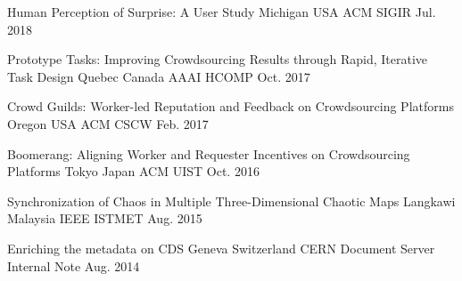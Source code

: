 

\begin{cventries}

  \cvpublications
    {Human Perception of Surprise: A User Study} %
    {Michigan USA}
    {ACM SIGIR} %
    {Jul. 2018} %


  \cvpublications
    {Prototype Tasks: Improving Crowdsourcing Results through Rapid, Iterative Task Design} %
    {Quebec Canada}
    {AAAI HCOMP} %
    {Oct. 2017} %


  \cvpublications
    {Crowd Guilds: Worker-led Reputation and Feedback on Crowdsourcing Platforms} %
    {Oregon USA}
    {ACM CSCW} %
    {Feb. 2017} %


  \cvpublications
    {Boomerang: Aligning Worker and Requester Incentives on Crowdsourcing Platforms} %
    {Tokyo Japan}
    {ACM UIST} %
    {Oct. 2016} %

  \cvpublications
    {Synchronization of Chaos in Multiple Three-Dimensional Chaotic Maps} %
    {Langkawi Malaysia}
    {IEEE ISTMET} %
    {Aug. 2015} %

  \cvpublications
    {Enriching the metadata on CDS} %
    {Geneva Switzerland}
    {CERN Document Server Internal Note} %
    {Aug. 2014} %

\end{cventries}
